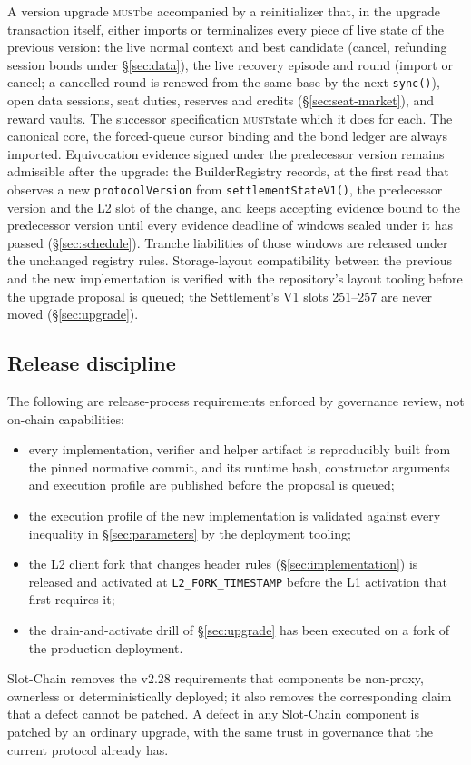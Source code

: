 \documentclass[a4paper,11pt]{article}
\newcommand{\code}[1]{\nolinkurl{#1}}
\newcommand{\must}{\textsc{must}}
\begin{document}
A version upgrade \must be accompanied by a reinitializer that, in the
upgrade transaction itself, either imports or terminalizes every piece of live
state of the previous version: the live normal context and best candidate
(cancel, refunding session bonds under \S\ref{sec:data}), the live recovery
episode and round (import or cancel; a cancelled round is renewed from the
same base by the next \code{sync()}), open data sessions, seat duties,
reserves and credits (\S\ref{sec:seat-market}), and reward vaults.  The
successor specification \must state which it does for each.  The canonical
core, the forced-queue cursor binding and the bond ledger are always imported.
Equivocation evidence signed under the predecessor version remains admissible
after the upgrade: the BuilderRegistry records, at the first read that
observes a new \code{protocolVersion} from \code{settlementStateV1()}, the
predecessor version and the L2 slot of the change, and keeps accepting
evidence bound to the predecessor version until every evidence deadline of
windows sealed under it has passed (\S\ref{sec:schedule}).  Tranche
liabilities of those windows are released under the unchanged registry rules.
Storage-layout compatibility between the previous and the new implementation
is verified with the repository's layout tooling before the upgrade
proposal is queued; the Settlement's V1 slots 251--257 are never moved
(\S\ref{sec:upgrade}).

\subsection{Release discipline}

The following are release-process requirements enforced by governance review,
not on-chain capabilities:
\begin{itemize}
\item every implementation, verifier and helper artifact is reproducibly
  built from the pinned normative commit, and its runtime hash, constructor
  arguments and execution profile are published before the proposal is queued;
\item the execution profile of the new implementation is validated against
  every inequality in \S\ref{sec:parameters} by the deployment tooling;
\item the L2 client fork that changes header rules (\S\ref{sec:implementation})
  is released and activated at \code{L2_FORK_TIMESTAMP} before the L1
  activation that first requires it;
\item the drain-and-activate drill of \S\ref{sec:upgrade} has been executed on
  a fork of the production deployment.
\end{itemize}
Slot-Chain removes the v2.28 requirements that components be non-proxy,
ownerless or deterministically deployed; it also removes the corresponding
claim that a defect cannot be patched.  A defect in any Slot-Chain component is
patched by an ordinary upgrade, with the same trust in governance that the
current protocol already has.
\end{document}
